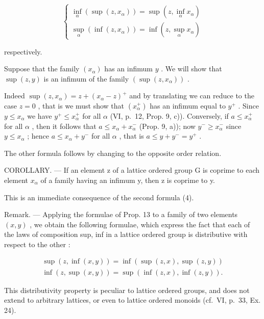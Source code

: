 \[
\left\{ \begin{array}{l} \inf _ {\alpha} (\sup (z, x _ {\alpha})) = \sup \left(z, \inf _ {\alpha} x _ {\alpha}\right) \\ \sup _ {\alpha} (\inf (z, x _ {\alpha})) = \inf \left(z, \sup _ {\alpha} x _ {\alpha}\right) \end{array} \right.\tag{4}
\]

respectively.

Suppose that the family \((x_{\alpha})\) has an infimum \(y\) . We will show that \(\sup (z,y)\) is an infimum of the family \((\sup (z,x_{\alpha}))\) .

Indeed \(\sup (z, x_{\alpha}) = z + (x_{\alpha} - z)^{+}\) and by translating we can reduce to the case \(z = 0\) , that is we must show that \((x_{\alpha}^{+})\) has an infimum equal to \(y^{+}\) . Since \(y \leqslant x_{\alpha}\) we have \(y^{+} \leqslant x_{\alpha}^{+}\) for all \(\alpha\) (VI, p.~12, Prop. 9, c)). Conversely, if \(a \leqslant x_{\alpha}^{+}\) for all \(\alpha\) , then it follows that \(a \leqslant x_{\alpha} + x_{\alpha}^{-}\) (Prop. 9, a)); now \(y^{-} \geqslant x_{\alpha}^{-}\) since \(y \leqslant x_{\alpha}\) ; hence \(a \leqslant x_{\alpha} + y^{-}\) for all \(\alpha\) , that is \(a \leqslant y + y^{-} = y^{+}\) .

The other formula follows by changing to the opposite order relation.

COROLLARY. --- If an element z of a lattice ordered group G is coprime to each element \(x_{\alpha}\) of a family having an infimum y, then z is coprime to y.

This is an immediate consequence of the second formula (4).

Remark. --- Applying the formulae of Prop. 13 to a family of two elements \((x, y)\) , we obtain the following formulae, which express the fact that each of the laws of composition sup, inf in a lattice ordered group is distributive with respect to the other :

\[
\begin{array}{l} \sup (z, \inf (x, y)) = \inf (\sup (z, x), \sup (z, y)) \\ \inf (z, \sup (x, y)) = \sup (\inf (z, x), \inf (z, y)). \end{array}
\]

This distributivity property is peculiar to lattice ordered groups, and does not extend to arbitrary lattices, or even to lattice ordered monoids (cf.~VI, p.~33, Ex. 24).
